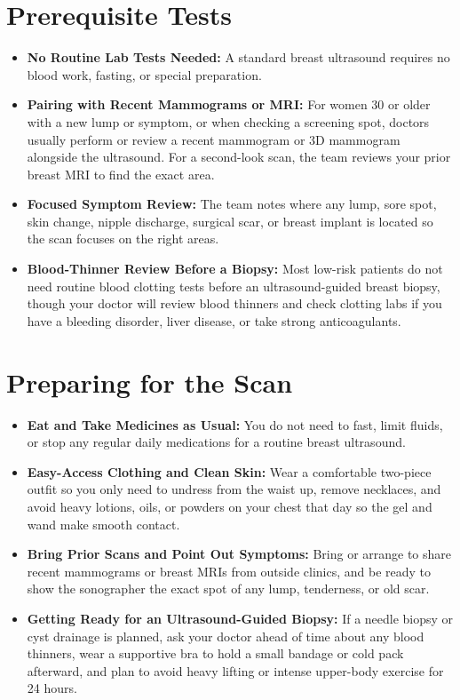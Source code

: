 \section{Prerequisite Tests}
\begin{itemize}
\item \textbf{No Routine Lab Tests Needed:} A standard breast ultrasound requires no blood work, fasting, or special preparation.
\item \textbf{Pairing with Recent Mammograms or MRI:} For women 30 or older with a new lump or symptom, or when checking a screening spot, doctors usually perform or review a recent mammogram or 3D mammogram alongside the ultrasound. For a second-look scan, the team reviews your prior breast MRI to find the exact area.
\item \textbf{Focused Symptom Review:} The team notes where any lump, sore spot, skin change, nipple discharge, surgical scar, or breast implant is located so the scan focuses on the right areas.
\item \textbf{Blood-Thinner Review Before a Biopsy:} Most low-risk patients do not need routine blood clotting tests before an ultrasound-guided breast biopsy, though your doctor will review blood thinners and check clotting labs if you have a bleeding disorder, liver disease, or take strong anticoagulants.
\end{itemize}

\section{Preparing for the Scan}
\begin{itemize}
\item \textbf{Eat and Take Medicines as Usual:} You do not need to fast, limit fluids, or stop any regular daily medications for a routine breast ultrasound.
\item \textbf{Easy-Access Clothing and Clean Skin:} Wear a comfortable two-piece outfit so you only need to undress from the waist up, remove necklaces, and avoid heavy lotions, oils, or powders on your chest that day so the gel and wand make smooth contact.
\item \textbf{Bring Prior Scans and Point Out Symptoms:} Bring or arrange to share recent mammograms or breast MRIs from outside clinics, and be ready to show the sonographer the exact spot of any lump, tenderness, or old scar.
\item \textbf{Getting Ready for an Ultrasound-Guided Biopsy:} If a needle biopsy or cyst drainage is planned, ask your doctor ahead of time about any blood thinners, wear a supportive bra to hold a small bandage or cold pack afterward, and plan to avoid heavy lifting or intense upper-body exercise for 24 hours.
\end{itemize}

